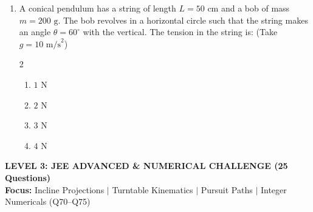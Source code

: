 \documentclass[11pt,a4paper]{article}
\begin{document}
\begin{enumerate}[label=\textbf{\textcolor{l2Amber}{Q\arabic*.}},leftmargin=24pt,itemsep=10pt,start=26]
  \item A conical pendulum has a string of length $L = 50\text{ cm}$ and a bob of mass $m = 200\text{ g}$. The bob revolves in a horizontal circle such that the string makes an angle $\theta = 60^\circ$ with the vertical. The tension in the string is: (Take $g = 10\text{ m/s}^2$)
  \begin{multicols}{2}
  \begin{enumerate}[label=\textbf{\textcolor{primaryDark}{(\Alph*)}},itemsep=2pt]
    \item $1\text{ N}$
    \item $2\text{ N}$
    \item $3\text{ N}$
    \item $4\text{ N}$
  \end{enumerate}
  \end{multicols}

\end{enumerate}

\newpage

\begin{tcolorbox}[l3banner]
  {\Large \textbf{\textsf{LEVEL 3: JEE ADVANCED \& NUMERICAL CHALLENGE (25 Questions)}}}\\[2pt]
  {\footnotesize \textbf{Focus:} Incline Projections $\vert$ Turntable Kinematics $\vert$ Pursuit Paths $\vert$ Integer Numericals (Q70--Q75)}
\end{tcolorbox}
\vspace{6pt}
\end{document}

